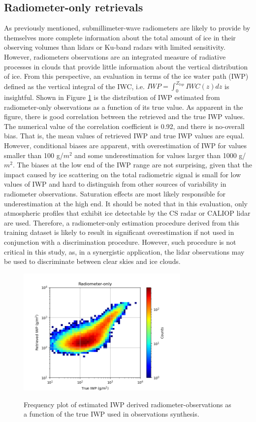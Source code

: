 \documentclass{ametsocV6.1}
\begin{document}
\subsection{Radiometer-only retrievals}
As previously mentioned, submillimeter-wave radiometers are likely to provide by themselves more complete 
information about the total amount of ice in their observing volumes than lidars or Ku-band radars with 
limited sensitivity. However, radiometers observations are an integrated measure of radiative processes in 
clouds that provide little information about the vertical distribution of ice. From this perspective, an 
evaluation in terms of the ice water path (IWP) defined as the vertical integral of the IWC, i.e. 
$IWP=\int_0^{Z_{top}}IWC(z)dz$ is insightful.  Shown in Figure \ref{f4} is the distribution of IWP 
estimated from radiometer-only observations as a function of its true value. As apparent in the figure, there is good 
correlation between the retrieved and the true IWP values. The numerical value of the correlation coefficient 
is 0.92, and there is no-overall bias. That is, the mean values of retrieved IWP and true IWP values are 
equal. However, conditional biases are apparent, with overestimation of IWP for values smaller than 
100 g/$m^2$ and some underestimation for values larger than 1000 g/$m^2$.  The biases at the low end of the 
IWP range are not surprising, given that the impact caused by ice scattering on the total radiometric signal 
is small for low values of IWP and hard to distinguish from other sources of variability in radiometer 
observations. Saturation effects are most likely responsible for underestimation at the high end.  It should 
be noted that in this evaluation, only atmospheric profiles that exhibit ice detectable by the CS radar or CALIOP lidar are used. 
Therefore,
a radiometer-only estimation procedure derived from this training dataset is likely to result in significant 
overestimation if not used in conjunction with a discrimination procedure. However, such procedure is not critical 
in this study, as, in a synergistic application, the lidar observations may be used to discriminate between clear skies and ice clouds.
\begin{figure}[t]
    \centering
    \includegraphics[width=0.75\textwidth,angle=0]{./Figs/fig04.png}\\
    \caption{Frequency plot of estimated IWP derived radiometer-observations as a function of the 
    true IWP used in observations synthesis.}\label{f4}
\end{figure}
\end{document}
